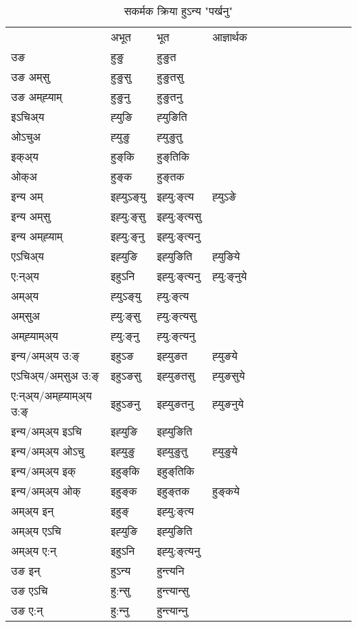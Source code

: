 \begin{table}[H]
\centering
\caption{\label{uŋ.vt} सकर्मक क्रिया  हुऽन्य  "पर्खनु"  }
\begin{tabular}{l|l|l|l|l|l|l|l|l|l|l|l|l}  \toprule
&अभूत & भूत & आज्ञार्थक \\ 
उङ &हुङु &हुङुत \\ 
उङ अम्‌सु &हुङुसु &हुङुतसु \\ 
उङ अम्‌ह्‍याम् &हुङुनु &हुङुतनु \\ 
इऽचिअ्य &ह्‍युङि &ह्‍युङिति   \\ 
ओऽचुअ &ह्‍युङु &ह्‍युङुतु   \\ 
इक्अ्य &हुङ्‌कि &हुङ्‌तिकि   \\ 
ओक्अ &हुङ्‌क &हुङ्‌तक   \\ 
इन्य अम् & इह्‍युऽङ्‌यु  & इह्‍यु:ङ्‌त्य &ह्‍युऽङे  \\ 
इन्य अम्‌सु & इह्‍यु:ङ्‌सु  & इह्‍यु:ङ्‌त्यसु   \\ 
इन्य अम्‌ह्‍याम् & इह्‍यु:ङ्‌नु  & इह्‍यु:ङ्‌त्यनु   \\ 
एऽचिअ्य & इह्‍युङि & इह्‍युङिति &ह्‍युङिये    \\ 
ए:न्अ्य & इहुऽनि  & इह्‍यु:ङ्‌त्यनु &ह्‍यु:ङ्‌नुये  \\ 
अम्अ्य & ह्‍युऽङ्‌यु  & ह्‍यु:ङ्‌त्य  \\ 
अम्‌सुअ & ह्‍यु:ङ्‌सु & ह्‍यु:ङ्‌त्यसु  \\ 
अम्‌ह्‍याम्अ्य & ह्‍यु:ङ्‌नु  & ह्‍यु:ङ्‌त्यनु \\ 
\midrule
इन्य/अम्अ्य उ:ङ्‌&इहुऽङ & इह्‍युङत &ह्‍युङये \\ 
एऽचिअ्य/अम्‌सुअ उ:ङ्‌ &इहुऽङसु & इह्‍युङतसु &ह्‍युङसुये \\ 
ए:न्अ्य/अम्‌ह्‍याम्अ्य उ:ङ्‌ &इहुऽङनु & इह्‍युङतनु &ह्‍युङनुये \\ 
इन्य/अम्अ्य इऽचि & इह्‍युङि & इह्‍युङिति    \\ 
इन्य/अम्अ्य ओऽचु & इह्‍युङु & इह्‍युङुतु  &ह्‍युङुये  \\ 
इन्य/अम्अ्य इक् & इहुङ्‌कि & इहुङ्‌तिकि   \\ 
इन्य/अम्अ्य ओक् & इहुङ्‌क & इहुङ्‌तक  &हुङ्‌कये  \\ 
अम्अ्य इन् & इहुङ्‌ & इह्‍यु:ङ्‌त्य   \\ 
अम्अ्य एऽचि & इह्‍युङि & इह्‍युङिति    \\ 
अम्अ्य ए:न् & इहुऽनि  & इह्‍यु:ङ्‌त्यनु  \\ 
\midrule
उङ इन् & हुऽन्य  & हुन्त्यनि  \\ 
उङ एऽचि & हु:न्सु  & हुन्त्यान्सु   \\ 
उङ ए:न्& हु:न्‍नु  & हुन्त्यान्‍नु   \\ 
\bottomrule
\end{tabular}
\end{table}


